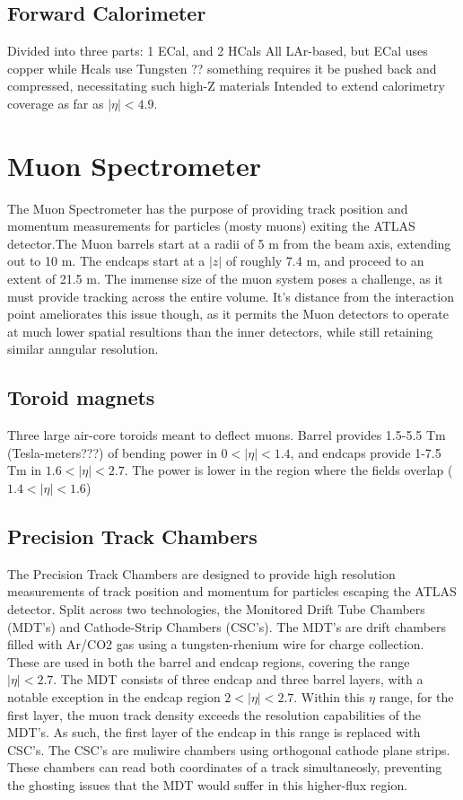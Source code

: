     \subsection{Forward Calorimeter}
        Divided into three parts: 1 ECal, and 2 HCals
        All LAr-based, but ECal uses copper while Hcals use Tungsten
        ?? something requires it be pushed back and compressed, necessitating such high-Z materials
        Intended to extend calorimetry coverage as far as $|\eta| < 4.9$.



\section{Muon Spectrometer}  %
    The Muon Spectrometer has the purpose of providing track position and momentum measurements for particles (mosty muons) exiting the ATLAS detector.The Muon barrels start at a radii of 5 m from the beam axis, extending out to 10 m. The endcaps start at a $|z|$ of roughly 7.4 m, and proceed to an extent of 21.5 m. The immense size of the muon system poses a challenge, as it must provide tracking across the entire volume. It's distance from the interaction point ameliorates this issue though, as it permits the Muon detectors to operate at much lower spatial resultions than the inner detectors, while still retaining similar anngular resolution.

    \subsection{Toroid magnets}
        Three large air-core toroids meant to deflect muons.
        Barrel provides 1.5-5.5 Tm (Tesla-meters???) of bending power in $0<|\eta|<1.4$,
        and endcaps provide 1-7.5 Tm in $1.6<|\eta|<2.7$.
        The power is lower in the region where the fields overlap ($1.4<|\eta|<1.6$)

    \subsection{Precision Track Chambers}
        The Precision Track Chambers are designed to provide high resolution measurements of track position and momentum for particles escaping the ATLAS detector. Split across two technologies, the Monitored Drift Tube Chambers (MDT's) and Cathode-Strip Chambers (CSC's).
        The MDT's are drift chambers filled with Ar/CO2 gas using a tungsten-rhenium wire for charge collection. These are used in both the barrel and endcap regions, covering the range $|\eta| < 2.7$. The MDT consists of three endcap and three barrel layers, with a notable exception in the endcap region $2 < |\eta| < 2.7$. Within this $\eta$ range, for the first layer, the muon track density exceeds the resolution capabilities of the MDT's. As such, the first layer of the endcap in this range is replaced with CSC's. The CSC's are muliwire chambers using orthogonal cathode plane strips. These chambers can read both coordinates of a track simultaneosly, preventing the ghosting issues that the MDT would suffer in this higher-flux region.

